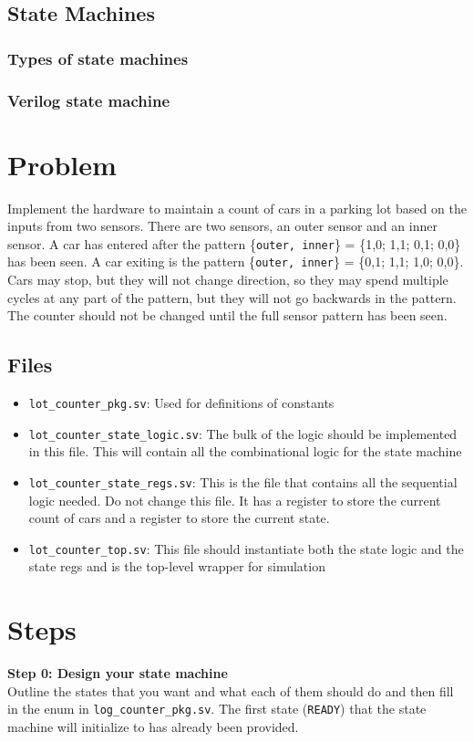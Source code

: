 \documentclass{article}
\begin{document}
\subsection*{State Machines}
\subsubsection*{Types of state machines}
\subsubsection*{Verilog state machine}

\section*{Problem}
Implement the hardware to maintain a count of cars in a parking lot based on the
inputs from two sensors. There are two sensors, an outer sensor and an inner
sensor. A car has entered after the pattern \{\texttt{outer, inner}\} = \{1,0; 1,1;
0,1; 0,0\} has been seen. A car exiting is the pattern \{\texttt{outer, inner}\} =
\{0,1; 1,1; 1,0; 0,0\}. Cars may stop, but they will not change direction, so they
may spend multiple cycles at any part of the pattern, but they will not go
backwards in the pattern.  The counter should not be changed until the full sensor
pattern has been seen.

\subsection*{Files}
\begin{itemize}
    \item \texttt{lot\_counter\_pkg.sv}: Used for definitions of constants
    \item \texttt{lot\_counter\_state\_logic.sv}: The bulk of the logic should
    be implemented in this file. This will contain all the combinational logic
    for the state machine
    \item \texttt{lot\_counter\_state\_regs.sv}: This is the file that contains
    all the sequential logic needed. Do not change this file. It has a register
    to store the current count of cars and a register to store the current
    state.
    \item \texttt{lot\_counter\_top.sv}: This file should instantiate both the
    state logic and the state regs and is the top-level wrapper for simulation
\end{itemize}

\section*{Steps}
\textbf{Step 0: Design your state machine}\\
Outline the states that you want and what each of them should do and then fill
in the enum in \texttt{log\_counter\_pkg.sv}. The first state (\texttt{READY})
that the state machine will initialize to has already been provided. 
\end{document}
